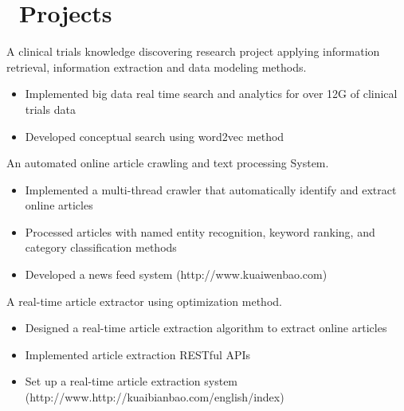 \documentclass{resume}
\begin{document}
\section{\faUsers\ Projects}



A clinical trials knowledge discovering research project applying information retrieval, information extraction and data modeling methods.
\begin{itemize}
  \item Implemented big data real time search and analytics for over 12G of clinical trials data
  \item Developed conceptual search using word2vec method
\end{itemize}

An automated online article crawling and text processing System.
\begin{itemize}
  \item Implemented a multi-thread crawler that automatically identify and extract online articles
  \item Processed articles with named entity recognition, keyword ranking, and category classification methods
  \item Developed a news feed system (http://www.kuaiwenbao.com)
\end{itemize}


A real-time article extractor using optimization method.
\begin{itemize}
  \item Designed a real-time article extraction algorithm to extract online articles
  \item Implemented article extraction RESTful APIs
  \item Set up a real-time article extraction system (http://www.http://kuaibianbao.com/english/index)
\end{itemize}
\end{document}
